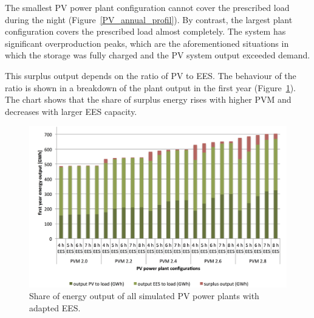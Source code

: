 
The smallest PV power plant configuration cannot cover the prescribed load during the night (Figure~\ref{PV_annual_profil}). By contrast, the largest plant configuration covers the prescribed load almost completely. The system has significant overproduction peaks, which are the aforementioned situations in which the storage was fully charged and the PV system output exceeded demand.  



This surplus output depends on the ratio of PV to EES. The behaviour of the ratio is shown in a breakdown of the plant output in the first year (Figure~\ref{PV_energy_output}). The chart shows that the share of surplus energy rises with higher PVM and decreases with larger EES capacity.

\begin{figure}[htbp]  
\centering
\includegraphics[width=1\linewidth]{FIG/PV_energy_output}
\caption[Share of energy output of all simulated PV power plants with adapted EES.]{Share of energy output of all simulated PV power plants with adapted EES.}\label{PV_energy_output}
\end{figure}

